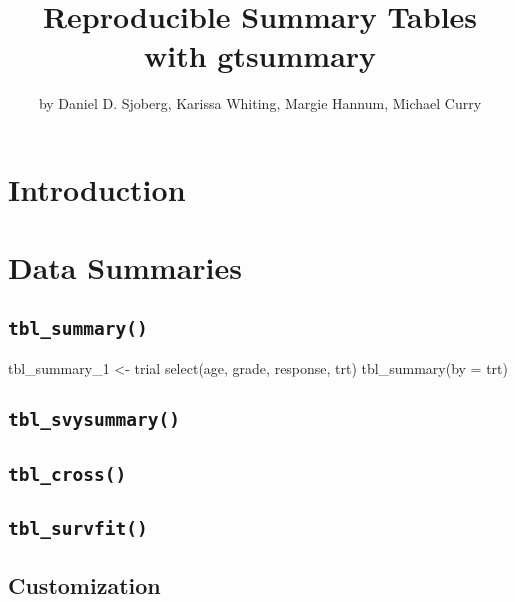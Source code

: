 \title{Reproducible Summary Tables with gtsummary}
\author{by Daniel D. Sjoberg, Karissa Whiting, Margie Hannum, Michael Curry}

\maketitle


\section{Introduction}

\section{Data Summaries}




\subsection{\texorpdfstring{\texttt{tbl\_summary()}}{tbl\_summary()}}

\begin{example}
tbl_summary_1 <-
  trial %
  select(age, grade, response, trt) %
  tbl_summary(by = trt)
\end{example}

\subsection{\texorpdfstring{\texttt{tbl\_svysummary()}}{tbl\_svysummary()}}

\subsection{\texorpdfstring{\texttt{tbl\_cross()}}{tbl\_cross()}}

\subsection{\texorpdfstring{\texttt{tbl\_survfit()}}{tbl\_survfit()}}

\subsection{Customization}

